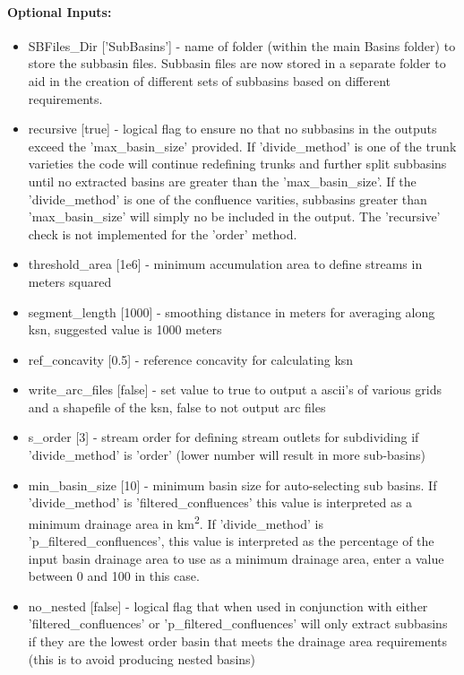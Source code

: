 \paragraph{Optional Inputs:}
\begin{itemize}
\item SBFiles\_Dir ['SubBasins'] - name of folder (within the main Basins folder) to store the subbasin files. Subbasin files are now stored in
a separate folder to aid in the creation of different sets of subbasins based on different requirements. 
\item recursive [true] - logical flag to ensure no that no subbasins in the outputs exceed the 'max\_basin\_size' provided. If 'divide\_method' is 
one of the trunk varieties the code will continue redefining trunks and further split subbasins until no extracted basins are greater
than the 'max\_basin\_size'. If the 'divide\_method' is one of the confluence varities, subbasins greater than 'max\_basin\_size' will simply
no be included in the output. The 'recursive' check is not implemented for the 'order' method.
\item threshold\_area [1e6] - minimum accumulation area to define streams in meters squared
\item segment\_length [1000] - smoothing distance in meters for averaging along ksn, suggested value is 1000 meters
\item ref\_concavity [0.5] - reference concavity for calculating ksn
\item write\_arc\_files [false] - set value to true to output a ascii's of various grids and a shapefile of the ksn, false to not output arc files
\item s\_order [3] - stream order for defining stream outlets for subdividing if 'divide\_method' is 'order' (lower number will result in more sub-basins)
\item min\_basin\_size [10] - minimum basin size for auto-selecting sub basins. If 'divide\_method' is 'filtered\_confluences' this value is
interpreted as a minimum drainage area in km\textsuperscript{2}. If 'divide\_method' is 'p\_filtered\_confluences', this value is interpreted as
the percentage of the input basin drainage area to use as a minimum drainage area, enter a value between 0 and 100 in this case.
\item no\_nested [false] - logical flag that when used in conjunction with either 'filtered\_confluences' or 'p\_filtered\_confluences' will only extract
subbasins if they are the lowest order basin that meets the drainage area requirements (this is to avoid producing nested basins)
\end{itemize}

